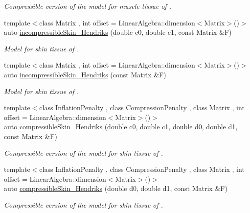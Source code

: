 \begin{DoxyCompactItemize}
\begin{DoxyCompactList}\small\item\em Compressible version of the model for muscle tissue of \cite{Martins1998}. \end{DoxyCompactList}\item 
{\footnotesize template$<$class Matrix , int offset = Linear\-Algebra\-::dimension$<$\-Matrix$>$()$>$ }\\auto \hyperlink{group__Biomechanics_gaa20bf15ef6976d64d89490429035b2c4}{incompressible\-Skin\-\_\-\-Hendriks} (double c0, double c1, const Matrix \&F)
\begin{DoxyCompactList}\small\item\em Model for skin tissue of \cite{Hendriks2005}. \end{DoxyCompactList}\item 
{\footnotesize template$<$class Matrix , int offset = Linear\-Algebra\-::dimension$<$\-Matrix$>$()$>$ }\\auto \hyperlink{group__Biomechanics_gad8653218bd2afb4e3cfd601a5142956c}{incompressible\-Skin\-\_\-\-Hendriks} (const Matrix \&F)
\begin{DoxyCompactList}\small\item\em Model for skin tissue of \cite{Hendriks2005}. \end{DoxyCompactList}\item 
{\footnotesize template$<$class Inflation\-Penalty , class Compression\-Penalty , class Matrix , int offset = Linear\-Algebra\-::dimension$<$\-Matrix$>$()$>$ }\\auto \hyperlink{group__Biomechanics_ga07b4c52c6ecf7e72f73ab5832fb262cd}{compressible\-Skin\-\_\-\-Hendriks} (double c0, double c1, double d0, double d1, const Matrix \&F)
\begin{DoxyCompactList}\small\item\em Compressible version of the model for skin tissue of \cite{Hendriks2005}. \end{DoxyCompactList}\item 
{\footnotesize template$<$class Inflation\-Penalty , class Compression\-Penalty , class Matrix , int offset = Linear\-Algebra\-::dimension$<$\-Matrix$>$()$>$ }\\auto \hyperlink{group__Biomechanics_ga42721e772b7eada1b0bca98247ad440f}{compressible\-Skin\-\_\-\-Hendriks} (double d0, double d1, const Matrix \&F)
\begin{DoxyCompactList}\small\item\em Compressible version of the model for skin tissue of \cite{Hendriks2005}. \end{DoxyCompactList}\item 

\end{DoxyCompactItemize}
